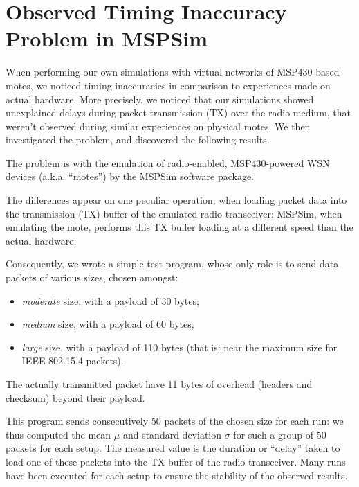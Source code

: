 \documentclass[10pt,final,journal,twocolumn]{IEEEtran}
\begin{document}

\section{Observed Timing Inaccuracy Problem in MSPSim}
\label{results}

When performing our own simulations with virtual networks of MSP430-based
motes, we noticed timing inaccuracies in comparison to experiences made
on actual hardware. More precisely, we noticed that our simulations showed
unexplained delays during packet transmission (TX) over the radio medium,
that weren't observed during similar experiences on physical motes.
We then investigated the problem, and discovered the following results.

The problem is with the emulation of radio-enabled, MSP430-powered WSN
devices (a.k.a. ``motes'') by the MSPSim software package.

The differences appear on one peculiar operation: when loading packet data
into the transmission (TX) buffer of the emulated radio transceiver:
MSPSim, when emulating the mote, performs this TX buffer loading at
a different speed than the actual hardware.

Consequently, we wrote a simple test program, whose only role is to send
data packets of various sizes, chosen amongst:
\begin{itemize}
\item \emph{moderate} size, with a payload of 30 bytes;
\item \emph{medium} size, with a payload of 60 bytes;
\item \emph{large} size, with a payload of 110 bytes (that is:
      near the maximum size for IEEE 802.15.4 packets\footnotemark[1]).
\end{itemize}
The actually transmitted packet have 11 bytes of overhead (headers and
checksum) beyond their payload.

This program sends consecutively 50 packets of the chosen size for each run:
we thus computed the mean $\mu$ and standard deviation $\sigma$ for such
a group of 50 packets for each setup. The measured value is the duration
or ``delay'' taken to load one of these packets into the TX buffer of
the radio transceiver. Many runs have been executed for each setup
to ensure the stability of the observed results.
\end{document}
